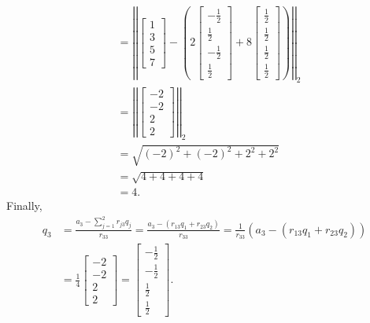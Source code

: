 \documentclass[letterpaper]{article}
\begin{document}
\begin{mdframed}
\begin{mdframed}
\begin{equation*}
\begin{aligned}
                    &= \left|\left| \begin{bmatrix}
                        1 \\ 3 \\ 5 \\ 7
                    \end{bmatrix} - \left(2 \begin{bmatrix}
                        -\frac{1}{2} \\ \frac{1}{2} \\ -\frac{1}{2} \\ \frac{1}{2}
                    \end{bmatrix} + 8 \begin{bmatrix}
                        \frac{1}{2} \\ \frac{1}{2} \\ \frac{1}{2} \\ \frac{1}{2}
                    \end{bmatrix}\right) \right|\right|_2 \\ 
                    &= \left|\left| \begin{bmatrix}
                        -2 \\ -2 \\ 2 \\ 2
                    \end{bmatrix} \right|\right|_2 \\ 
                    &= \sqrt{(-2)^2 + (-2)^2 + 2^2 + 2^2} \\ 
                    &= \sqrt{4 + 4 + 4 + 4} \\ 
                    &= 4.
            \end{aligned}
        \end{equation*}
        Finally,
        \begin{equation*}
            \begin{aligned}
                q_3 &= \frac{a_3 - \sum_{j = 1}^{2} r_{j3}q_j}{r_{33}} = \frac{a_3 - (r_{13}q_1 + r_{23}q_2)}{r_{33}} = \frac{1}{r_{33}} (a_3 - (r_{13}q_1 + r_{23}q_2)) \\ 
                    &= \frac{1}{4} \begin{bmatrix}
                        -2 \\ -2 \\ 2 \\ 2
                    \end{bmatrix} = \begin{bmatrix}
                        -\frac{1}{2} \\ -\frac{1}{2} \\ \frac{1}{2} \\ \frac{1}{2}
                    \end{bmatrix}.
            \end{aligned}
        \end{equation*}
    \end{mdframed}


\end{mdframed}
\end{document}
